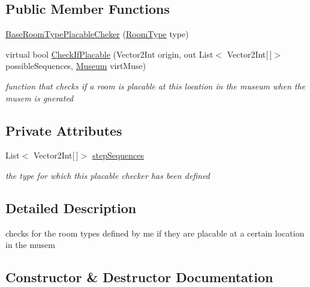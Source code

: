 \subsection*{Public Member Functions}
\begin{DoxyCompactItemize}
\item 
\mbox{\hyperlink{class_base_room_type_placable_cheker_a5d13e7de140af3ba2a4aa12e3724f333}{Base\+Room\+Type\+Placable\+Cheker}} (\mbox{\hyperlink{_room_8cs_ab540f7414f306325d92272bcef1e34e1}{Room\+Type}} type)
\item 
virtual bool \mbox{\hyperlink{class_base_room_type_placable_cheker_a1081710d512b5f2496d390ece6cdbadd}{Check\+If\+Placable}} (Vector2\+Int origin, out List$<$ Vector2\+Int\mbox{[}$\,$\mbox{]}$>$ possible\+Sequences, \mbox{\hyperlink{class_museum}{Museum}} virt\+Muse)
\begin{DoxyCompactList}\small\item\em function that checks if a room is placable at this location in the museum when the musem is gnerated \end{DoxyCompactList}\end{DoxyCompactItemize}
\subsection*{Private Attributes}
\begin{DoxyCompactItemize}
\item 
List$<$ Vector2\+Int\mbox{[}$\,$\mbox{]}$>$ \mbox{\hyperlink{class_base_room_type_placable_cheker_aa1c2ec3105266167905e9be9af7a82be}{step\+Sequences}}
\begin{DoxyCompactList}\small\item\em the type for which this placable checker has been defined \end{DoxyCompactList}\end{DoxyCompactItemize}


\subsection{Detailed Description}
checks for the room types defined by me if they are placable at a certain location in the musem 



\subsection{Constructor \& Destructor Documentation}
\mbox{\label{class_base_room_type_placable_cheker_a5d13e7de140af3ba2a4aa12e3724f333}} 
